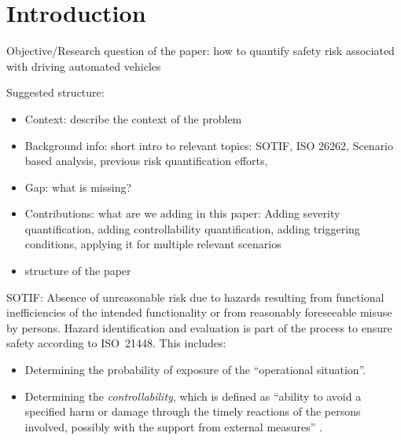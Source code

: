 \section{Introduction}
\label{sec:introduction}

Objective/Research question of the paper: how to quantify safety risk associated with driving automated vehicles 

Suggested structure: 
\begin{itemize}
    \item Context: describe the context of the problem
    \item Background info: short intro to relevant topics: SOTIF, ISO 26262, Scenario based analysis, previous risk quantification efforts, 
    \item Gap: what is missing?  
    \item Contributions: what are we adding in this paper: Adding severity quantification, adding controllability quantification, adding triggering conditions, applying it for multiple relevant scenarios
    \item structure of the paper
\end{itemize}

SOTIF: Absence of unreasonable risk due to hazards resulting from functional inefficiencies of the intended functionality or from reasonably foreseeable misuse by persons.
Hazard identification and evaluation is part of the process to ensure safety according to ISO~21448.
This includes:
\begin{itemize}
    \item Determining the probability of exposure of the ``operational situation''.
    \item Determining the \emph{controllability}, which is defined as ``ability to avoid a specified harm or damage through the timely reactions of the persons involved, possibly with the support from external measures'' \autocite{ISO26262}.
\end{itemize}
